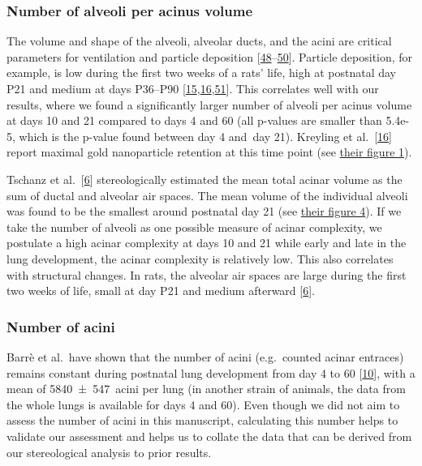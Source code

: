\documentclass[
  american,
]{article}
\begin{document}
\hypertarget{number-of-alveoli-per-acinus-volume}{%
\subsubsection{Number of alveoli per acinus volume}\label{number-of-alveoli-per-acinus-volume}}

The volume and shape of the alveoli, alveolar ducts, and the acini are critical parameters for ventilation and particle deposition {[}\protect\hyperlink{ref-eioib1TQ}{48}--\protect\hyperlink{ref-OT4s1CSX}{50}{]}.
Particle deposition, for example, is low during the first two weeks of a rats' life, high at postnatal day P21 and medium at days P36--P90 {[}\protect\hyperlink{ref-yHHhvOtP}{15},\protect\hyperlink{ref-18DcNLAv6}{16},\protect\hyperlink{ref-VJYqPtdT}{51}{]}.
This correlates well with our results, where we found a significantly larger number of alveoli per acinus volume at days 10 and 21 compared to days 4 and 60 (all p-values are smaller than 5.4e-5, which is the p-value found between day 4 and~day 21).
Kreyling et al.~{[}\protect\hyperlink{ref-18DcNLAv6}{16}{]} report maximal gold nanoparticle retention at this time point (see \href{https://pubs.acs.org/doi/10.1021/acsnano.8b01826\#fig1}{their figure 1}).

Tschanz et al.~{[}\protect\hyperlink{ref-wnl86DEM}{6}{]} stereologically estimated the mean total acinar volume as the sum of ductal and alveolar air spaces.
The mean volume of the individual alveoli was found to be the smallest around postnatal day 21 (see \href{https://www.physiology.org/na101/home/literatum/publisher/physio/journals/content/jappl/2014/jappl.2014.117.issue-1/japplphysiol.01355.2013/production/images/medium/zdg0121410620004.jpeg}{their figure 4}).
If we take the number of alveoli as one possible measure of acinar complexity, we postulate a high acinar complexity at days 10 and 21 while early and late in the lung development, the acinar complexity is relatively low.
This also correlates with structural changes.
In rats, the alveolar air spaces are large during the first two weeks of life, small at day P21 and medium afterward {[}\protect\hyperlink{ref-wnl86DEM}{6}{]}.

\hypertarget{number-of-acini-1}{%
\subsubsection{Number of acini}\label{number-of-acini-1}}

Barrè et al.~have shown that the number of acini (e.g.~counted acinar entraces) remains constant during postnatal lung development from day 4 to 60 {[}\protect\hyperlink{ref-14OP85b2F}{10}{]}, with a mean of 5840~±~547~acini per lung (in another strain of animals, the data from the whole lungs is available for days 4 and 60).
Even though we did not aim to assess the number of acini in this manuscript, calculating this number helps to validate our assessment and helps us to collate the data that can be derived from our stereological analysis to prior results.
\end{document}
